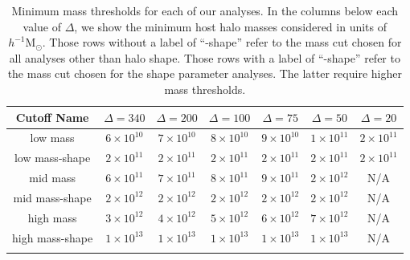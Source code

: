 \documentclass[usenatbib,fleqn]{mnras}
\begin{document}
\begin{table}
\caption{
Minimum mass thresholds for each of our analyses. 
In the columns below each value of $\Delta$, we show the minimum 
host halo masses considered in units of $h^{-1}\mathrm{M}_{\odot}$.
Those rows without a label of ``-shape'' refer to the mass cut chosen for 
all analyses other than halo shape. Those rows with a label of ``-shape'' refer to 
the mass cut chosen for the shape parameter analyses. The latter require higher mass thresholds.}
\vspace*{8pt}
\begin{tabular}{ c c c c c c c }
\hline
\hline
Cutoff Name &  $\Delta=340$ & $\Delta=200$ & $\Delta=100$ & $\Delta=75$ & $\Delta=50$ & $\Delta=20$ \\
\hline
\vspace*{2pt}
{low mass} & $6 \times 10^{10}$ & $7 \times 10^{10}$ & $8 \times 10^{10}$ & $9 \times 10^{10}$ & $1 \times 10^{11}$ & $2 \times 10^{11}$  \\ \vspace*{4pt}
{low mass-shape} & $2 \times 10^{11}$ & $2 \times 10^{11}$ & $2 \times 10^{11}$ & $2 \times 10^{11}$ & $2 \times 10^{11}$ & $2 \times 10^{11}$ \\
{mid mass} & $6 \times 10^{11}$ & $7 \times 10^{11}$ & $8 \times 10^{11}$ & $9 \times 10^{11}$ & $2 \times 10^{12}$ & {N/A} \\ \vspace*{4pt}
{mid mass-shape} & $2 \times 10^{12}$ & $2 \times 10^{12}$ & $2 \times 10^{12}$ & $2 \times 10^{12}$ & $2 \times 10^{12}$ & {N/A} \\
{high mass} & $3 \times 10^{12}$ & $4 \times 10^{12}$ & $5 \times 10^{12}$ & $6 \times 10^{12}$ & $7 \times 10^{12}$ & {N/A} \\ \vspace*{2pt}
{high mass-shape} & $1 \times 10^{13}$ & $1 \times 10^{13}$ & $1 \times 10^{13}$ & $1 \times 10^{13}$ & $1 \times 10^{13}$ & {N/A} \\
\hline
\hline \\
\end{tabular}
\label{table:thresholds}
\end{table}
\end{document}
